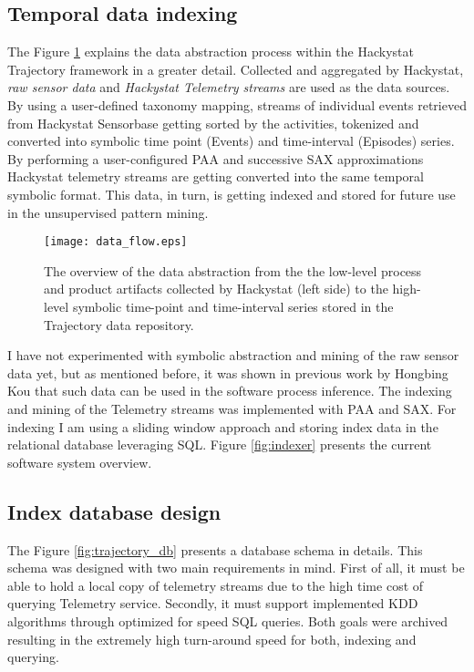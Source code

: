 \subsection{Temporal data indexing}
The Figure \ref{fig:data_flow} explains the data abstraction process within the Hackystat Trajectory framework in a greater detail. Collected and aggregated by Hackystat, \textit{raw sensor data} and \textit{Hackystat Telemetry streams} are used as the data sources. By using a user-defined taxonomy mapping, streams of individual events retrieved from Hackystat Sensorbase getting sorted by the activities, tokenized and converted into symbolic time point (Events) and time-interval (Episodes) series. By performing a user-configured PAA and successive SAX approximations Hackystat telemetry streams are getting converted into the same temporal symbolic format. This data, in turn, is getting indexed and stored for future use in the unsupervised pattern mining.

\begin{figure}[tbp]
   \centering
   \texttt{[image: data\_flow.eps]}
   \caption{The overview of the data abstraction from the the low-level process and product artifacts collected by Hackystat (left side) to the high-level symbolic time-point and time-interval series stored in the Trajectory data repository.}
   \label{fig:data_flow}
\end{figure}

I have not experimented with symbolic abstraction and mining of the raw sensor data yet, but as mentioned before, it was shown in previous work by Hongbing Kou that such data can be used in the software process inference. The indexing and mining of the Telemetry streams was implemented with PAA and SAX. For indexing I am using a sliding window approach and storing index data in the relational database leveraging SQL. Figure \ref{fig:indexer} presents the current software system overview.

\subsection{Index database design}
The Figure \ref{fig:trajectory_db} presents a database schema in details. This schema was designed with two main requirements in mind. First of all, it must be able to hold a local copy of telemetry streams due to the high time cost of querying Telemetry service. Secondly, it must support implemented KDD algorithms through optimized for speed SQL queries. Both goals were archived resulting in the extremely high turn-around speed for both, indexing and querying.

